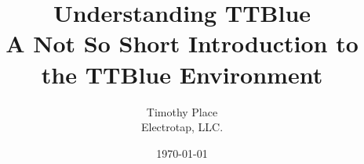 \documentclass[10pt,a4paper]{book}
\begin{document}
\frontmatter


	
\title{\textbf{Understanding TTBlue}\\
A Not So Short Introduction to the TTBlue Environment}
\author{Timothy Place\\
Electrotap, LLC.}
\date{\today}
\maketitle



\tableofcontents

\mainmatter

\renewcommand{\!}[1]{\lstinline®#1®}
















\nocite{*}
\end{document}

